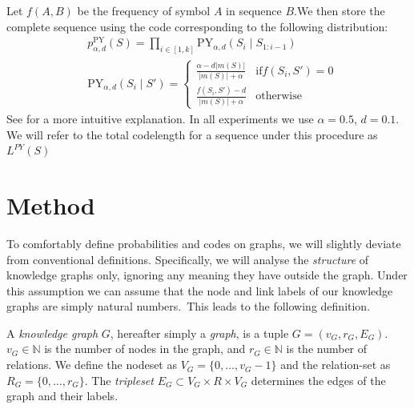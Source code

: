 \documentclass[letterpaper]{article} %
\newcommand{\N}{{\mathbb N}}
\begin{document}
Let $f(A, B)$ be the frequency of symbol $A$ in sequence $B$.We then store the complete sequence using the code corresponding to the following distribution:
\begin{align*}
&p^\text{PY}_{\alpha,d}(S) = \prod_{i \in [1,k]} \text{PY}_{\alpha,d}(S_i\mid S_{1:i-1}) \\
&\text{PY}_{\alpha,d}(S_i \mid S') = 
\begin{cases}
\frac{\alpha - d |m(S)|}{|m(S)| + \alpha} & \text{if} f(S_i, S') = 0 \\ 
\frac{f(S_i, S') - d}{|m(S)| + \alpha} & \text{otherwise}
\end{cases}
\end{align*}
See \cite{de2016names} for a more intuitive explanation. In all experiments we use $\alpha = 0.5$, $d=0.1$. We will refer to the total codelength for a sequence under this procedure as $L^{PY}(S)$

\section{Method}
To comfortably define probabilities and codes on graphs, we will slightly deviate from conventional definitions. Specifically, we will analyse the \emph{structure} of knowledge graphs only, ignoring any meaning they have outside the graph. Under this assumption we can assume that the node and link labels of our knowledge graphs are simply natural numbers.\footnotemark~This leads to the following definition.


A \emph{knowledge graph} $G$, hereafter simply a \emph{graph}, is a tuple $G = (v_G, r_G, E_G)$. $v_G \in \N$ is the number of nodes in the graph, and $r_G \in \N$ is the number of relations. We define the nodeset as $V_G = \{0, \ldots, v_G-1\}$ and the relation-set as $R_G = \{0, \ldots, r_G\}$. The \emph{tripleset} $E_G \subset V_G \times R \times V_G$ determines the edges of the graph and their labels. 
\end{document}
